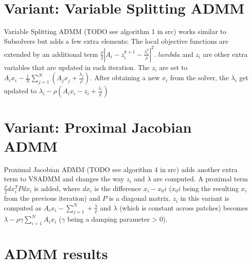 \documentclass[a4paper,twoside,12pt,nochapterprefix]{scrbook}
\begin{document}
\section{Variant: Variable Splitting ADMM}
Variable Splitting ADMM (TODO see algorithm 1 in src) works similar to Subsolvers but adds a few extra elements: The local objective functions%
 are extended by an additional term $\frac{\rho}{2}|A_i - z^{k+1}_i -\frac{\lambda_i^k}{\rho} |^2$. $lambda$ and $z_i$ are other extra variables that are updated in each iteration. The $z_i$ are set to $A_i x_i - \frac{1}{N}\sum_{j=1}^N(A_j x_j + \frac{\lambda_j}{\rho})$. After obtaining a new $x_i$ from the solver, the $\lambda_i$ get updated to $\lambda_i - \rho(A_i x_i - z_i +\frac{\lambda_i}{\rho})$
\section{Variant: Proximal Jacobian ADMM}
Proximal Jacobian ADMM (TODO see algorithm 4 in src) adds another extra term to VSADMM and changes the way $z_i$ and $\lambda$ are computed. A proximal term $\frac{\rho}{2} dx_i^T P dx_i$ is added, where $dx_i$ is the difference $x_i - x_0i$ ($x_0i$ being the resulting $x_i$ from the previous iteration) and $P$ is a diagonal matrix. $z_i$ in this variant is computed as $A_i x_i - \sum_{j=1}^N + \frac{\lambda}{\rho}$ and $\lambda$ (which is constant across patches) becomes $\lambda - \rho \gamma \sum_{i=1}^N A_i x_i$ ($\gamma$ being a damping parameter > 0).
\section{ADMM results}
\end{document}
